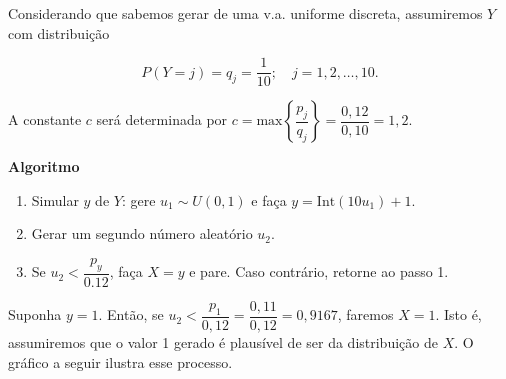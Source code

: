 \documentclass[
  letterpaper,
  DIV=11,
  numbers=noendperiod]{scrreprt}
\providecommand{\tightlist}{%
  \setlength{\itemsep}{0pt}\setlength{\parskip}{0pt}}\usepackage{longtable,booktabs,array}
\begin{document}
Considerando que sabemos gerar de uma v.a. uniforme discreta,
assumiremos \(Y\) com distribuição

\[P(Y=j)=q_j=\dfrac{1}{10}; \quad j=1,2, \ldots, 10.\]

A constante \(c\) será determinada por
\(c=\mbox{max}\left\{\dfrac{p_j}{q_j}\right\} =\dfrac{0,\!12}{0,\!10}=1,\!2.\)

\begin{tcolorbox}[enhanced jigsaw, toprule=.15mm, arc=.35mm, colframe=quarto-callout-warning-color-frame, breakable, opacityback=0, rightrule=.15mm, bottomrule=.15mm, left=2mm, leftrule=.75mm, colback=white]

\vspace{-3mm}\textbf{Algoritmo}\vspace{3mm}

\begin{enumerate}
\def\labelenumi{\arabic{enumi}.}
\tightlist
\item
  Simular \(y\) de \(Y\): gere \(u_1 \sim U(0,1)\) e faça
  \(y = \mathrm{Int}(10u_1)+1\).
\item
  Gerar um segundo número aleatório \(u_2\).
\item
  Se \(u_2 < \dfrac{p_y}{0.12}\), faça \(X=y\) e pare. Caso contrário,
  retorne ao passo 1.
\end{enumerate}

\end{tcolorbox}

\begin{tcolorbox}[enhanced jigsaw, coltitle=black, bottomtitle=1mm, toprule=.15mm, arc=.35mm, colframe=quarto-callout-note-color-frame, breakable, opacityback=0, bottomrule=.15mm, rightrule=.15mm, titlerule=0mm, toptitle=1mm, title=\textcolor{quarto-callout-note-color}{\faInfo}\hspace{0.5em}{Nota}, leftrule=.75mm, opacitybacktitle=0.6, left=2mm, colback=white, colbacktitle=quarto-callout-note-color!10!white]

Suponha \(y=1\). Então, se
\(u_2<\dfrac{p_1}{0,\!12}=\dfrac{0,\!11}{0,\!12}=0,\!9167\), faremos
\(X=1\). Isto é, assumiremos que o valor 1 gerado é plausível de ser da
distribuição de \(X\). O gráfico a seguir ilustra esse processo.

\end{tcolorbox}
\end{document}

